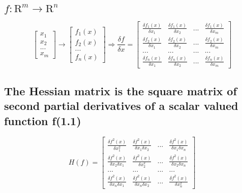 \documentclass[12pt,letterpaper]{article}
\begin{document}
\subsection{$f: \mathrm{R}^m \rightarrow \mathrm{R}^n$}
    $$
    \begin{bmatrix}
        x_1\\
        x_2\\
        ...\\
        x_m
    \end{bmatrix}
    \rightarrow
    \begin{bmatrix}
        f_1(x)\\
        f_2(x)\\
        ...\\
        f_n(x)
    \end{bmatrix}
    \Rightarrow
    \frac{\delta f}{\delta x} = \begin{bmatrix}
                                    \frac{\delta f_1(x)}{\delta x_1} & \frac{\delta f_1(x)}{\delta x_2} & ... & \frac{\delta f_1(x)}{\delta x_m}\\
                                    \frac{\delta f_2(x)}{\delta x_1} & \frac{\delta f_2(x)}{\delta x_2} & ... & \frac{\delta f_2(x)}{\delta x_m}\\
                                                                 ... &                              ... & ... &                             ... \\
                                    \frac{\delta f_n(x)}{\delta x_1} & \frac{\delta f_n(x)}{\delta x_2} & ... & \frac{\delta f_n(x)}{\delta x_m}
                                \end{bmatrix}   
    $$

\subsection{The Hessian matrix is the square matrix of second partial derivatives of a scalar valued function f(1.1)}
    $$
    H(f) = \begin{bmatrix}
                \frac{\delta f^2(x)}{\delta x_1^2} & \frac{\delta f^2(x)}{\delta x_1\delta x_2} & ... & \frac{\delta f^2(x)}{\delta x_1\delta x_n}\\
                \frac{\delta f^2(x)}{\delta x_2\delta x_1} & \frac{\delta f^2(x)}{\delta x_2^2} & ... & \frac{\delta f^2(x)}{\delta x_2\delta x_n}\\
                                             ... &                              ... & ... &                             ... \\
                \frac{\delta f^2(x)}{\delta x_n\delta x_1} & \frac{\delta f^2(x)}{\delta x_n\delta x_2} & ... & \frac{\delta f^2(x)}{\delta x_n^2}
           \end{bmatrix}  
    $$
\end{document}
